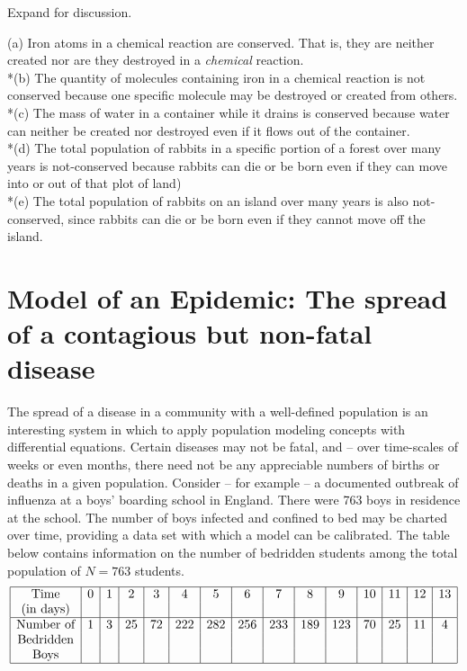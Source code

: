 \documentclass{ximera}
\begin{document}
Expand for discussion.

\begin{expandable}
(a)  Iron atoms in a chemical reaction are conserved.  That is, they are neither created nor are they destroyed in a \textit{chemical} reaction.
\\*(b)  The quantity of molecules containing iron in a chemical reaction is not conserved because one specific molecule may be destroyed or created from others.  
\\*(c)  The mass of water in a container while it drains is conserved because water can neither be created nor destroyed even if it flows out of the container.
\\*(d)  The total population of rabbits in a specific portion of a forest over many years is not-conserved because rabbits can die or be born even if they can move into or out of that plot of land)
\\*(e)  The total population of rabbits on an island over many years is also not-conserved, since rabbits can die or be born even if they cannot move off the island.

\end{expandable}

 
\section*{Model of an Epidemic: The spread of a contagious but non-fatal disease} 

The spread of a disease in a community with a well-defined population is an interesting system in which to apply population modeling concepts with differential equations.  Certain diseases may not be fatal, and -- over time-scales of weeks or even months, there need not be any appreciable numbers of births or deaths in a given population.  Consider – for example – a documented outbreak of influenza at a boys' boarding school in England.  There were 763 boys in residence at the school.  The number of boys infected and confined to bed may be charted over time, providing a data set with which a model can be calibrated.  The table below contains information on the number of bedridden students among the total population of $N=763$ students.
$$ 
\begin{array}{|c|c|c|c|c|c|c|c|c|c|c|c|c|c|c|c|c|c|c|c|c|c|}\hline
\text{Time}           & 0 & 1 &  2 &  3 &  4 & 5 &   6  & 7 &   8 &   9 & 10 & 11 & 12 & 13  \\
\text{(in days)}&  &  &   &   &   &     &     &  &    &    &  &  &  & 
\\\hline
\text{Number of} &1 & 3 & 25 & 72 & 222 & 282 & 256 & 233 & 189 & 123 & 70 & 25 & 11 &  4 \\
\text{Bedridden} & &  &   &   &   &     &     &  &    &    &  &  &  & \\
\text{Boys} & &  &   &   &   &     &     &  &    &    &  &  &  & \\\hline
\end{array}
$$
\end{document}

